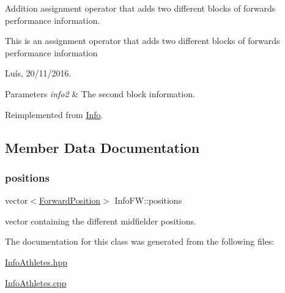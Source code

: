 Addition assignment operator that adds two different blocks of forward\textquotesingle{}s performance information. 

This is an assignment operator that adds two different blocks of forward\textquotesingle{}s performance information

Luís, 20/11/2016. 


\begin{DoxyParams}{Parameters}
{\em info2} & The second block information. \\
\hline
\end{DoxyParams}


Reimplemented from \hyperlink{class_info_a35d820d35f8ab3b8de15cdfc07f0c5a4}{Info}.



\subsection{Member Data Documentation}
\hypertarget{class_info_f_w_ab6a247d57fee089e4a7ad08e798c101b}{}\label{class_info_f_w_ab6a247d57fee089e4a7ad08e798c101b} 
\subsubsection{\texorpdfstring{positions}{positions}}
{\footnotesize\ttfamily vector$<$\hyperlink{_utils_8hpp_ae6ffae6f01bd3312aac4a44642f14620}{Forward\+Position}$>$ Info\+F\+W\+::positions\hspace{0.3cm}{\ttfamily [protected]}}



vector containing the different midfielder positions. 



The documentation for this class was generated from the following files\+:\begin{DoxyCompactItemize}
\item 
\hyperlink{_info_athletes_8hpp}{Info\+Athletes.\+hpp}\item 
\hyperlink{_info_athletes_8cpp}{Info\+Athletes.\+cpp}\end{DoxyCompactItemize}
